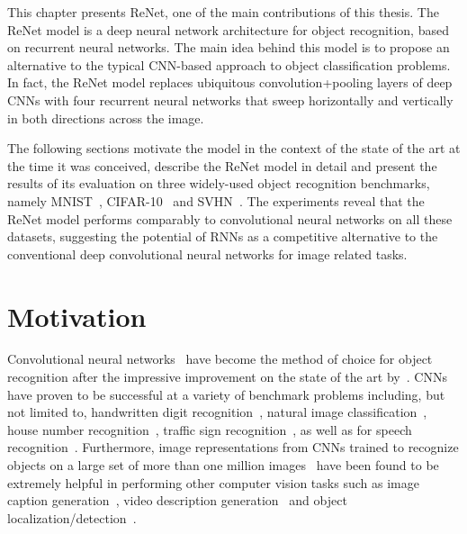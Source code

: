 This chapter presents ReNet, one of the main contributions of this thesis.
The ReNet model is a deep neural network architecture for object recognition,
based on recurrent neural networks. The main idea behind this model is to
propose an alternative to the typical CNN-based approach to object
classification problems. In fact, the ReNet model replaces ubiquitous
convolution+pooling layers of deep CNNs with four recurrent neural networks
that sweep horizontally and vertically in both directions across the image.

The following sections motivate the model in the context of the state of the
art at the time it was conceived, describe the ReNet model in detail and
present the results of its evaluation on three widely-used object recognition
benchmarks, namely  MNIST~\citep{Lecun99objectrecognition},
CIFAR-10~\citep{KrizhevskyHinton2009} and SVHN~\citep{Netzer-wkshp-2011}. The
experiments reveal that the ReNet model performs comparably to convolutional
neural networks on all these datasets, suggesting the potential of RNNs as a
competitive alternative to the conventional deep convolutional neural networks
for image related tasks.


\section{Motivation}

Convolutional neural networks~\cite[CNN,][]{Fukushima80,LeCun89} have become
the method of choice for object recognition after the impressive improvement on
the state of the art by~\cite{Krizhevsky-2012}. CNNs have proven to be
successful at a variety of benchmark problems including, but not limited to,
handwritten digit recognition~\citep[see, e.g.,][]{Ciresan-2012}, natural image
classification~\citep[see, e.g.,][]{Lin2014,Simonyan2015,szegedy2014going},
house number recognition~\citep[see, e.g.,][]{Goodfellow+et+al-ICLR2014a},
traffic sign recognition~\citep[see, e.g.,][]{Ciresan-et-al-2012}, as well as
for speech recognition~\citep[see, e.g.,][]{Hamid2012, sainath2013,
toth2014combining}.  Furthermore, image representations from CNNs trained to
recognize objects on a large set of more than one million
images~\citep{Simonyan2015,szegedy2014going} have been found to be extremely
helpful in performing other computer vision tasks such as image caption
generation~\citep[see, e.g.,][]{Vinyals-et-al-arxiv2014,Xu-et-al-arxiv2015},
video description generation~\citep[see, e.g.,][]{Li2015} and object
localization/detection~\citep[see, e.g.,][]{Sermanet14}.

